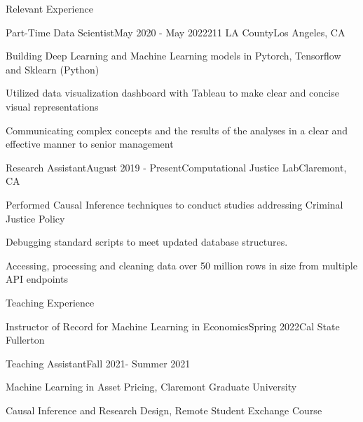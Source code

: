 \documentclass{resume} %
\begin{document}
\begin{rSection}{Relevant Experience}
\begin{rSubsection}{Part-Time Data Scientist}{May 2020 - May 2022}{211 LA County}{Los Angeles, CA}
\item Building Deep Learning and Machine Learning models in Pytorch,
Tensorflow and Sklearn (Python)
\item Utilized data visualization dashboard with Tableau to make clear and concise visual representations
\item Communicating complex concepts and the results of the analyses in a clear and effective manner to senior management
\end{rSubsection}
\begin{rSubsection}{Research Assistant}{August 2019 - Present}{Computational Justice Lab}{Claremont, CA}
\item Performed Causal Inference techniques to conduct studies addressing Criminal Justice Policy
\item Debugging standard scripts to meet updated database
structures.
\item Accessing, processing and cleaning data over 50 million rows in size from multiple API endpoints
\end{rSubsection}
\end{rSection}

\begin{rSection}{Teaching Experience}
\begin{rSubsection}{Instructor of Record for Machine Learning in Economics}{Spring 2022}{Cal State Fullerton}{}



\vspace{-.1cm}
\vspace{-0.7cm}
\item[]
\end{rSubsection}

\begin{rSubsection}{Teaching Assistant}{Fall 2021- Summer 2021}{}{}

\item Machine Learning in Asset Pricing, Claremont Graduate University
\item Causal Inference and Research Design, Remote Student Exchange Course

\vspace{-0.7cm}
\item[]
\end{rSubsection}
\end{rSection}
\end{document}

